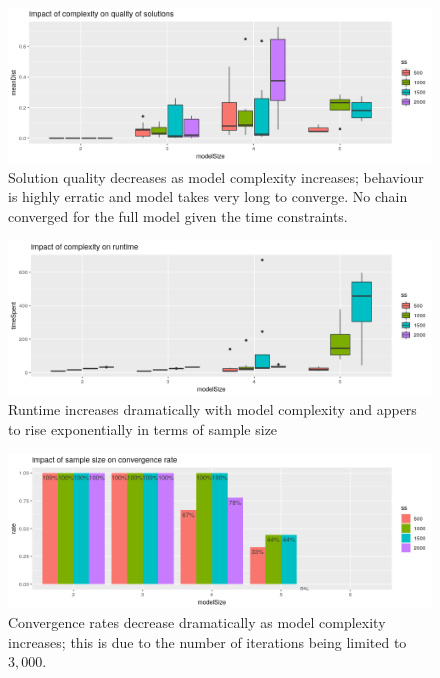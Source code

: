 \begin{figure}
	\includegraphics[width=\linewidth]{img/sim_ben_mh_quality.png}
	\caption{Solution quality decreases as model complexity increases; behaviour is highly erratic and model takes very long to converge. No chain converged for the full model given the time constraints.}
	\label{fig:mh_quality}
\end{figure}



\begin{figure}
	\includegraphics[width=\linewidth]{img/sim_ben_mh_runtime.png}
	\caption{Runtime increases dramatically with model complexity and appers to rise exponentially in terms of sample size}
	\label{fig:mh_runtime}
\end{figure}


\begin{figure}
	\includegraphics[width=\linewidth]{img/sim_ben_mh_convergence.png}
	\caption{Convergence rates decrease dramatically as model complexity increases; this is due to the number of iterations being limited to $3,000$.}
	\label{fig:mh_convergence}
\end{figure}


